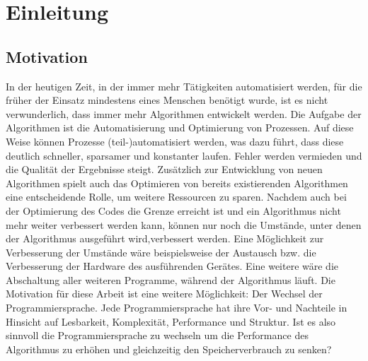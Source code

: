 \chapter{Einleitung}
\section{Motivation}
In der heutigen Zeit, in der immer mehr Tätigkeiten automatisiert werden, für die früher der Einsatz mindestens eines Menschen
benötigt wurde, ist es nicht verwunderlich, dass immer mehr Algorithmen entwickelt werden. Die Aufgabe der Algorithmen ist die
Automatisierung und Optimierung von Prozessen. Auf diese Weise können Prozesse (teil-)automatisiert werden, was dazu führt, dass
diese deutlich schneller, sparsamer und konstanter laufen. Fehler werden vermieden und die Qualität der Ergebnisse steigt.
Zusätzlich zur Entwicklung von neuen Algorithmen spielt auch das Optimieren von bereits existierenden Algorithmen eine entscheidende
Rolle, um weitere Ressourcen zu sparen. Nachdem auch bei der Optimierung des Codes die Grenze erreicht ist und ein Algorithmus
nicht mehr weiter verbessert werden kann, können nur noch die Umstände, unter denen der Algorithmus ausgeführt wird,verbessert werden.
Eine Möglichkeit zur Verbesserung der Umstände wäre beispielsweise der Austausch bzw. die Verbesserung der Hardware
des ausführenden Gerätes. Eine weitere wäre die Abschaltung aller weiteren Programme, während der Algorithmus läuft. Die Motivation für
diese Arbeit ist eine weitere Möglichkeit: Der Wechsel der Programmiersprache. Jede Programmiersprache hat ihre Vor- und Nachteile
in Hinsicht auf Lesbarkeit, Komplexität, Performance und Struktur. Ist es also sinnvoll die Programmiersprache zu wechseln um die Performance
des Algorithmus zu erhöhen und gleichzeitig den Speicherverbrauch zu senken?

